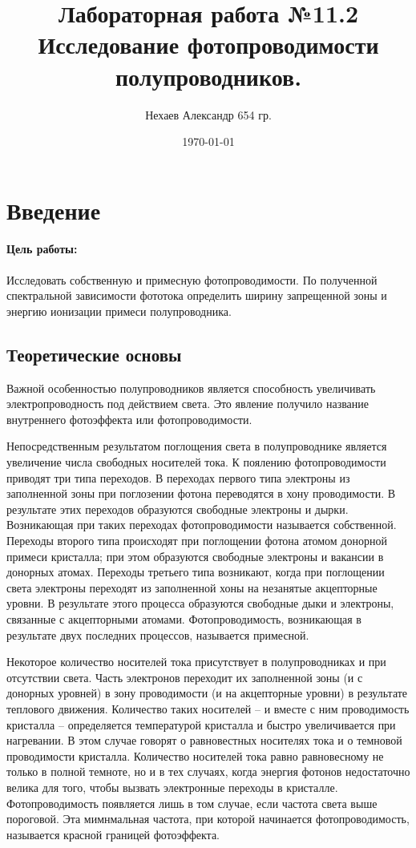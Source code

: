 \documentclass[a4paper, 12pt]{article}
\begin{document}
	\title{Лабораторная работа №11.2\\Исследование фотопроводимости полупроводников.}
	\author{Нехаев Александр 654 гр.}
	\date{\today}
	\maketitle
	\tableofcontents
	\section{Введение}
	\paragraph{Цель работы:}
	Исследовать собственную и примесную фотопроводимости. По полученной спектральной зависимости фототока определить ширину запрещенной зоны и энергию ионизации примеси полупроводника.
	\subsection{Теоретические основы}
	Важной особенностью полупроводников является способность увеличивать электропроводность под действием света. Это явление получило название внутреннего фотоэффекта или фотопроводимости.

	Непосредственным результатом поглощения света в полупроводнике является увеличение числа свободных носителей тока. К поялению фотопроводимости приводят три типа переходов. В переходах первого типа электроны из заполненной зоны при поглозении фотона переводятся в хону проводимости. В результате этих переходов образуются свободные электроны и дырки. Возникающая при таких переходах фотопроводимости называется собственной. Переходы второго типа происходят при поглощении фотона атомом донорной примеси кристалла; при этом образуются свободные электроны и вакансии в донорных атомах. Переходы третьего типа возникают, когда при поглощении света электроны переходят из заполненной хоны на незанятые акцепторные уровни. В результате этого процесса образуются свободные дыки и электроны, связанные с акцепторными атомами. Фотопроводимость, возникающая в результате двух последних процессов, называется примесной.

	Некоторое количество носителей тока присутствует в полупроводниках и при отсутствии света. Часть электронов переходит их заполненной зоны (и с донорных уровней) в зону проводимости (и на акцепторные уровни) в результате теплового движения. Количество таких носителей -- и вместе с ним проводимость кристалла -- определяется температурой кристалла и быстро увеличивается при нагревании. В этом случае говорят о равновестных носителях тока и о темновой проводимости кристалла. Количество носителей тока равно равновесному не только в полной темноте, но и в тех случаях, когда энергия фотонов недостаточно велика для того, чтобы вызвать электронные переходы в кристалле. Фотопроводимость появляется лишь в том случае, если частота света выше пороговой. Эта мимнмальная частота, при которой начинается фотопроводимость, называется красной границей фотоэффекта.
	
\end{document}
